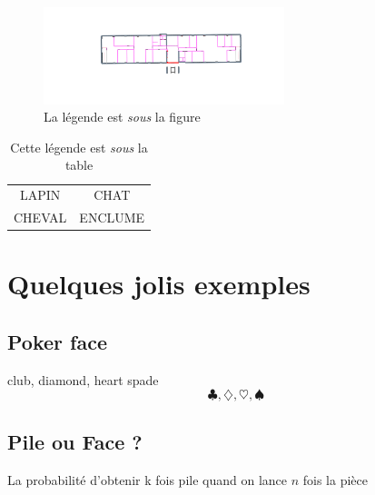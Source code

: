 \documentclass[twocolumn,a4paper]{IEEEtranfr}
\begin{document}
{\begin{verbatim}
\end{verbatim}

\begin{figure}[htbp]
\begin{centering}
\par
\includegraphics[width=7cm]{Gs2.pdf}
\caption{La légende est \emph{sous} la figure}
\end{centering}
\end{figure}
%



\begin{table}[htbp]
\centering{}
\begin{tabular}{|cc|}
\hline 
LAPIN & CHAT \\
CHEVAL  & ENCLUME \\
\hline
\end{tabular}
\caption{Cette légende  est \emph{sous} la table}
\end{table}
 
\section{Quelques jolis exemples}

\subsection{Poker face}

club, diamond, heart spade
$$\clubsuit, \diamondsuit, \heartsuit ,\spadesuit$$

\subsection{Pile ou Face ? }

La probabilité d'obtenir k fois pile quand on lance $n$ fois la pièce

}
\end{document}
